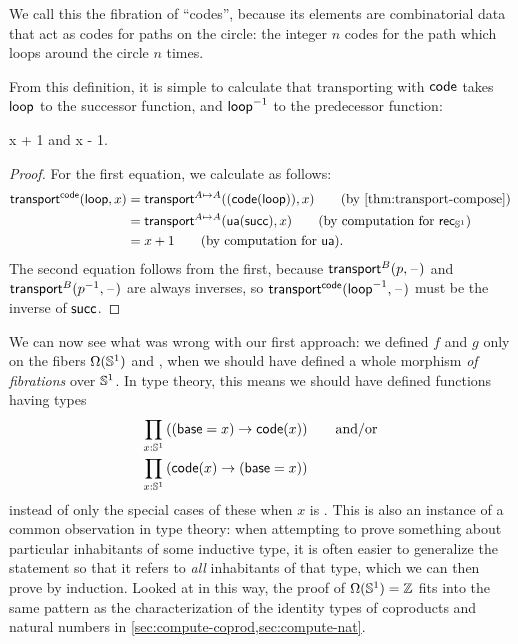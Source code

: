 We call this the fibration of ``codes'', because its elements are combinatorial data that act as codes for paths on the circle: the integer $n$ codes for the path which loops around the circle $n$ times.

From this definition, it is simple to calculate that transporting with
$\mathsf{code}$ takes $\mathsf{loop}$ to the successor function, and
$\mathord{{\mathsf{loop}}^{-1}}$ to the predecessor function:
\begin{lem} \label{lem:transport-s1-code}
 {x + 1} and
 {x - 1}.
\end{lem}
\begin{proof}
For the first equation, we calculate as follows:
\begin{align}
{\transfib \code \lloop x}
&= \transfib {A \mapsto A} {(\ap{\code}{\lloop})} x \tag{by \cref{thm:transport-compose}}\\
&= \transfib {A \mapsto A} {\ua (\Zsuc)} x \tag{by computation for $\rec{\Sn^1}$}\\
&= x + 1 \tag{by computation for \ua}.
\end{align}
The second equation follows from the first, because $\mathsf{transport}^{B}(p,\mathord{\hspace{1pt}\text{--}\hspace{1pt}})$ and $\mathsf{transport}^{B}(\mathord{{p}^{-1}},\mathord{\hspace{1pt}\text{--}\hspace{1pt}})$ are always inverses, so $\mathsf{transport}^{\mathsf{code}}(\mathord{{\mathsf{loop}}^{-1}},\mathord{\hspace{1pt}\text{--}\hspace{1pt}})$ must be the inverse of $\mathsf{succ}$.
\end{proof}

We can now see what was wrong with our first approach: we defined $f$ and $g$ only on the fibers $\Omega(\mathbb{S}^1)$ and \Z, when we should have defined a whole morphism \emph{of fibrations} over $\mathbb{S}^1$.
In type theory, this means we should have defined functions having types
\begin{align}
  \prd{x:\Sn^1} &((\base=x) \to \code(x)) \qquad\text{and/or} \label{eq:pi1s1-encode}\\
  \prd{x:\Sn^1} &(\code(x) \to (\base=x))\label{eq:pi1s1-decode}
\end{align}
instead of only the special cases of these when $x$ is \base.
This is also an instance of a common observation in type theory: when attempting to prove something about particular inhabitants of some inductive type, it is often easier to generalize the statement so that it refers to \emph{all} inhabitants of that type, which we can then prove by induction.
Looked at in this way, the proof of $\Omega(\mathbb{S}^1)=\mathbb{Z}$ fits into the same pattern as the characterization of the identity types of coproducts and natural numbers in \cref{sec:compute-coprod,sec:compute-nat}.

